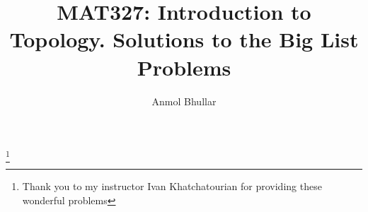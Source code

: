 \documentclass{amstext-l}
\theoremstyle{definition}
\theoremstyle{remark}
\numberwithin{section}{chapter}
\numberwithin{equation}{chapter}
\begin{document}
\frontmatter

\title{MAT327: Introduction to Topology. Solutions to the Big List Problems}


\author{Anmol Bhullar}
\address{ Undergraduate Student University of Toronto, Scarborough}
\thanks{Thank you to my instructor Ivan Khatchatourian for providing these wonderful problems}


\keywords{}

\maketitle


\setcounter{page}{5}

\tableofcontents



\mainmatter


\appendix


\backmatter



\printindex
\end{document}
